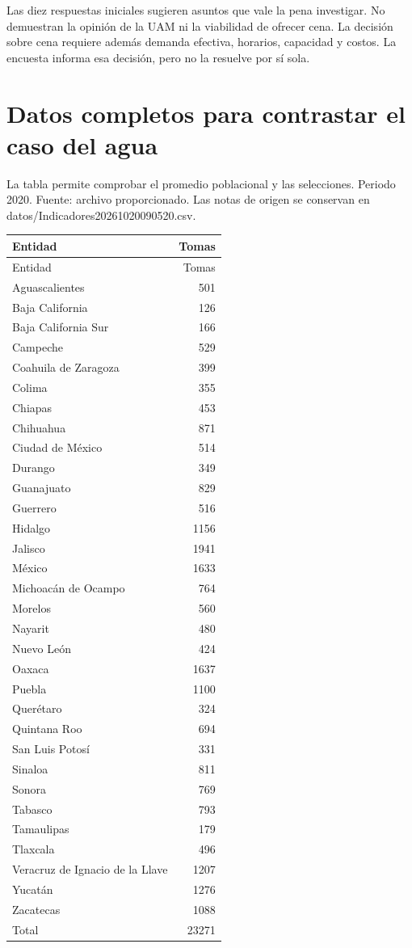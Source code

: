 \documentclass[11pt,letterpaper]{article}
\begin{document}
Las diez respuestas iniciales sugieren asuntos que vale la pena investigar. No demuestran la opinión de la UAM ni la viabilidad de ofrecer cena. La decisión sobre cena requiere además demanda efectiva, horarios, capacidad y costos. La encuesta informa esa decisión, pero no la resuelve por sí sola.

\clearpage\section{Datos completos para contrastar el caso del agua}\small
La tabla permite comprobar el promedio poblacional y las selecciones. Periodo 2020. Fuente: archivo proporcionado. Las notas de origen se conservan en datos/Indicadores20261020090520.csv.

\begin{longtable}{p{}r}\toprule Entidad & Tomas \\ \midrule\endfirsthead\toprule Entidad & Tomas \\ \midrule\endhead
Aguascalientes & 501 \\
Baja California & 126 \\
Baja California Sur & 166 \\
Campeche & 529 \\
Coahuila de Zaragoza & 399 \\
Colima & 355 \\
Chiapas & 453 \\
Chihuahua & 871 \\
Ciudad de México & 514 \\
Durango & 349 \\
Guanajuato & 829 \\
Guerrero & 516 \\
Hidalgo & 1156 \\
Jalisco & 1941 \\
México & 1633 \\
Michoacán de Ocampo & 764 \\
Morelos & 560 \\
Nayarit & 480 \\
Nuevo León & 424 \\
Oaxaca & 1637 \\
Puebla & 1100 \\
Querétaro & 324 \\
Quintana Roo & 694 \\
San Luis Potosí & 331 \\
Sinaloa & 811 \\
Sonora & 769 \\
Tabasco & 793 \\
Tamaulipas & 179 \\
Tlaxcala & 496 \\
Veracruz de Ignacio de la Llave & 1207 \\
Yucatán & 1276 \\
Zacatecas & 1088 \\
\midrule Total & 23271 \\ \bottomrule\end{longtable}\clearpage
\end{document}
